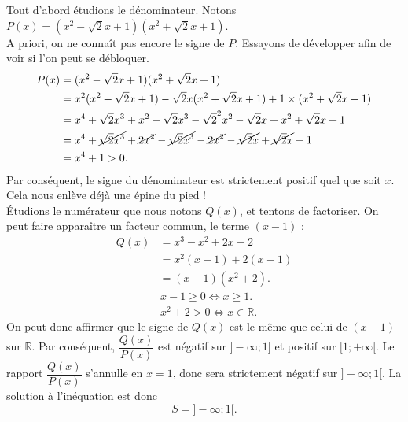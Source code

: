 \documentclass[12pt,
addpoints,
answers,
fleqn
]{exam}
\begin{document}
\begin{questions}
\begin{solution}
        Tout d'abord étudions le dénominateur. Notons $P(x)=(x^2-\sqrt{2}x +1)(x^2+\sqrt{2}x+1)$.\\
        A priori, on ne connaît pas encore le signe de $P$. Essayons de développer afin de voir si l'on peut se débloquer.
        \begin{align*}
            P(x) & =(x^2-\sqrt{2}x +1)(x^2+\sqrt{2}x+1)                                                                                             \\
                 & = x^2(x^2 + \sqrt{2}x+1) -\sqrt{2}x(x^2+\sqrt{2}x+1) + 1\times(x^2 +\sqrt{2}x+1)                                                 \\
                 & = x^4 + \sqrt{2}x^3 + x^2 - \sqrt{2}x^3 - \sqrt{2}^2x^2 - \sqrt{2}x + x^2 + \sqrt{2}x +1                                         \\
                 & = x^4 + \cancel{\sqrt{2}x^3} + \cancel{2x^2} - \cancel{\sqrt{2}x^3} - \cancel{2x^2} - \cancel{\sqrt{2}x} + \cancel{\sqrt{2}x} +1 \\
                 & = x^4 +1 > 0.
        \end{align*}
        Par conséquent, le signe du dénominateur est strictement positif quel que soit $x$. Cela nous enlève déjà une épine du pied !\\
        \'Etudions le numérateur que nous notons $Q(x)$, et tentons de factoriser. On peut faire apparaître un facteur commun, le terme $(x-1)$ :
        \begin{align*}
            Q(x) & = x^3-x^2 + 2x - 2  \\
                 & = x^2(x-1) + 2(x-1) \\
                 & = (x-1)(x^2 + 2).
        \end{align*}
        \begin{align*}
             & x-1 \geq 0 \iff x\geq 1.       \\
             & x^2+2 > 0 \iff x\in\mathbb{R}.
        \end{align*}
        On peut donc affirmer que le signe de $Q(x)$ est le même que celui de $(x-1)$ sur $\mathbb{R}$. Par conséquent, $\dfrac{Q(x)}{P(x)}$ est négatif sur $]-\infty;1]$ et positif
        sur $[1;+\infty[$. Le rapport $\dfrac{Q(x)}{P(x)}$ s'annulle en $x=1$, donc sera strictement négatif sur $]-\infty ; 1[$.
        La solution à l'inéquation est donc
        \[
            \boxed{S=]-\infty ; 1[}.
        \]
    \end{solution}


\end{questions}
\end{document}

